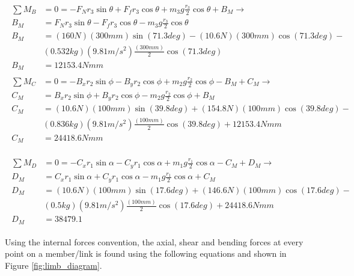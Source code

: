     \begin{gather}
    \begin{split}
    \sum M_B &= 0 = -F_N r_3 \sin{\theta} + F_f r_3 \cos{\theta} + m_3 g \frac{r_3}{2} \cos{\theta} + B_M  \rightarrow
    \\
    B_M &= F_N r_3 \sin{\theta} - F_f r_3 \cos{\theta} - m_3 g\frac{r_3}{2} \cos{\theta}
    \\
    B_M &= (160N)(300mm) \sin{(71.3 deg)} - (10.6N)(300mm) \cos{(71.3 deg)} -
    \\
    &(0.532kg)(9.81m/s^2)\frac{(300mm)}{2} \cos{(71.3 deg)}
    \\
    B_M&= 12153.4Nmm
    \end{split}  \label{eq:limb_B_M}
    \end{gather}
    \begin{gather}
    \begin{split}
    \sum M_C &= 0 = -B_x r_2 \sin{\phi}- B_y r_2 \cos{\phi} + m_2 g \frac{r_2}{2}\cos{\phi} - B_M + C_M \rightarrow
        \\
     C_M &= B_x r_2 \sin{\phi}+ B_y r_2 \cos{\phi} -m_2 g \frac{r_2}{2}\cos{\phi} + B_M
     \\
    C_M &= (10.6N)(100mm) \sin{(39.8 deg)}+ (154.8N) (100mm) \cos{(39.8deg)} -
    \\
    &(0.836kg)(9.81m/s^2) \frac{(100mm)}{2}\cos{(39.8 deg)} + 12153.4Nmm 
    \\
    C_M &= 24418.6Nmm
     \label{eq:limb_C_M}
    \end{split}
    \end{gather}
    
    \begin{gather}
    \begin{split}
        \sum M_D &= 0 = -C_x r_1 \sin{\alpha} -C_y r_1 \cos{\alpha} + m_1 g \frac{r_1}{2}\cos{\alpha} - C_M +D_M \rightarrow
    \\
    D_M &= C_x r_1 \sin{\alpha} +C_y r_1 \cos{\alpha} - m_1 g \frac{r_1}{2}\cos{\alpha} +C_M 
    \\
    D_M &= (10.6N) (100mm) \sin{(17.6 deg)} +(146.6N) (100 mm) \cos{(17.6 deg)} - 
    \\
    &(0.5kg) (9.81m/s^2) \frac{(100 mm)}{2}\cos{(17.6 deg)} +24418.6 Nmm
    \\
    D_M&= 38479.1\label{eq:limb_D_M}
    \end{split}
\end{gather}

Using the internal forces convention, the axial, shear and bending forces at every point on a member/link is found using the following equations and shown in Figure \ref{fig:limb_diagram}.

